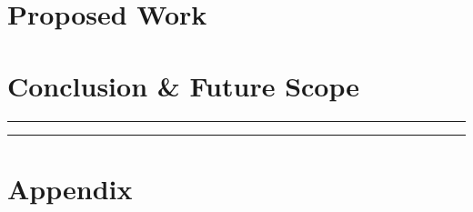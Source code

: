 \documentclass[12pt, a4paper, twoside]{article}
\begin{document}
	\section{Proposed Work}
	
	\section{Conclusion \& Future Scope}
	
	\hrule
	
	
	\hrule
	\section*{Appendix}
	\appendix
	
\end{document}

